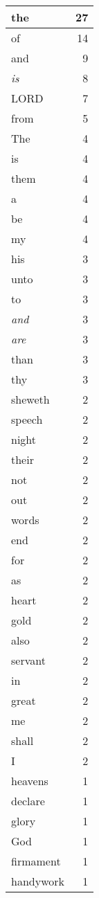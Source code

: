 \begin{center}
\begin{longtable}{l|r}
\hline \hline
\endlastfoot
the & 27 \\ \hline
of & 14 \\ \hline
and & 9 \\ \hline
\emph{is} & 8 \\ \hline
LORD & 7 \\ \hline
from & 5 \\ \hline
The & 4 \\ \hline
is & 4 \\ \hline
them & 4 \\ \hline
a & 4 \\ \hline
be & 4 \\ \hline
my & 4 \\ \hline
his & 3 \\ \hline
unto & 3 \\ \hline
to & 3 \\ \hline
\emph{and} & 3 \\ \hline
\emph{are} & 3 \\ \hline
than & 3 \\ \hline
thy & 3 \\ \hline
sheweth & 2 \\ \hline
speech & 2 \\ \hline
night & 2 \\ \hline
their & 2 \\ \hline
not & 2 \\ \hline
out & 2 \\ \hline
words & 2 \\ \hline
end & 2 \\ \hline
for & 2 \\ \hline
as & 2 \\ \hline
heart & 2 \\ \hline
gold & 2 \\ \hline
also & 2 \\ \hline
servant & 2 \\ \hline
in & 2 \\ \hline
great & 2 \\ \hline
me & 2 \\ \hline
shall & 2 \\ \hline
I & 2 \\ \hline
heavens & 1 \\ \hline
declare & 1 \\ \hline
glory & 1 \\ \hline
God & 1 \\ \hline
firmament & 1 \\ \hline
handywork & 1 \\ \hline

\end{longtable}
\end{center}
